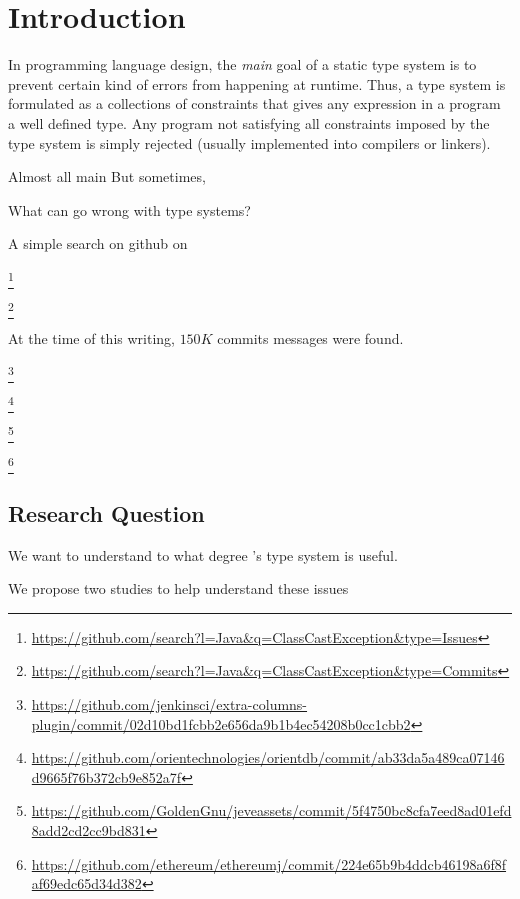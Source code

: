 
\chapter{Introduction}

In programming language design, the \emph{main} goal of a static type system is to prevent certain kind of errors from happening at runtime.
Thus, a type system is formulated as a collections of constraints that gives any expression in a program a well defined type.
Any program not satisfying all constraints imposed by the type system is simply rejected (usually implemented into compilers or linkers).


Almost all main
But sometimes, 

\cite{milnerTheoryTypePolymorphism1978}

What can go wrong with type systems?


A simple search on github on 

\footnote{\url{https://github.com/search?l=Java&q=ClassCastException&type=Issues}}

\footnote{\url{https://github.com/search?l=Java&q=ClassCastException&type=Commits}}

At the time of this writing, \circa{} $150K$ commits messages were found.

\footnote{\url{https://github.com/jenkinsci/extra-columns-plugin/commit/02d10bd1fcbb2e656da9b1b4ec54208b0cc1cbb2}}

\footnote{\url{https://github.com/orientechnologies/orientdb/commit/ab33da5a489ca07146d9665f76b372cb9e852a7f}}

\footnote{\url{https://github.com/GoldenGnu/jeveassets/commit/5f4750bc8cfa7eed8ad01efd8add2cd2cc9bd831}}

\footnote{\url{https://github.com/ethereum/ethereumj/commit/224e65b9b4ddcb46198a6f8faf69edc65d34d382}}

\section{Research Question}

We want to understand to what degree \java{}'s type system is useful.


We propose two studies to help understand these issues

